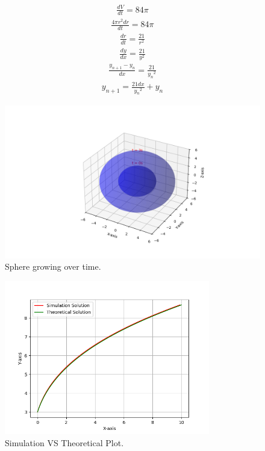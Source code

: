 \documentclass[journal]{IEEEtran}
\numberwithin{equation}{enumi}
\numberwithin{figure}{enumi}
\begin{document}
  \begin{align}
	  \frac{dV}{dt} = 84\pi
  \end{align}
  \begin{align}
	  \frac{4\pi r^2dr}{dt} = 84\pi
  \end{align}
  \begin{align}
	  \frac{dr}{dt} = \frac{21}{r^2}
  \end{align}
  \begin{align}
	  \frac{dy}{dx} = \frac{21}{y^2}                      
  \end{align}
  \begin{align}
          \frac{y_{n+1} - y_n}{dx} = \frac{21}{{y_n}^2}
  \end{align}
  \begin{align}
          y_{n+1} = \frac{21dx}{{y_n}^2} + y_n
  \end{align}

\begin{figure}[H]
    \centering
    \includegraphics[width=\textwidth]{figs/growing_sphere.png}
    \caption{Sphere growing over time.}
\end{figure}

\begin{figure}[H]
    \centering
    \includegraphics[width=0.8\textwidth]{figs/fig.png}
    \caption{Simulation VS Theoretical Plot.}
\end{figure}
\end{document}

